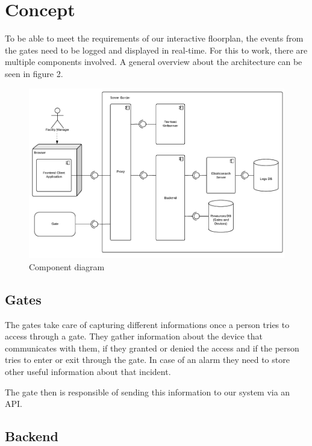 \section{Concept}
To be able to meet the requirements of our interactive floorplan, the events from the gates need to be logged and displayed in real-time. For this to work, there are multiple components involved. A general overview about the architecture can be seen in figure 2.

\begin{figure}[!hb]
	\centering
	\includegraphics[width=1\linewidth]{images/Komponentendiagramm}
	\caption{Component diagram}
	\label{fig:Komponentendiagramm}
\end{figure}

\subsection{Gates}
\label{Gates}

The gates take care of capturing different informations once a person tries to access through a gate. They gather information about the device that communicates with them, if they granted or denied the access and if the person tries to enter or exit through the gate. In case of an alarm they need to store other useful information about that incident.

The gate then is responsible of sending this information to our system via an API.


\subsection{Backend}
\label{Backend}

